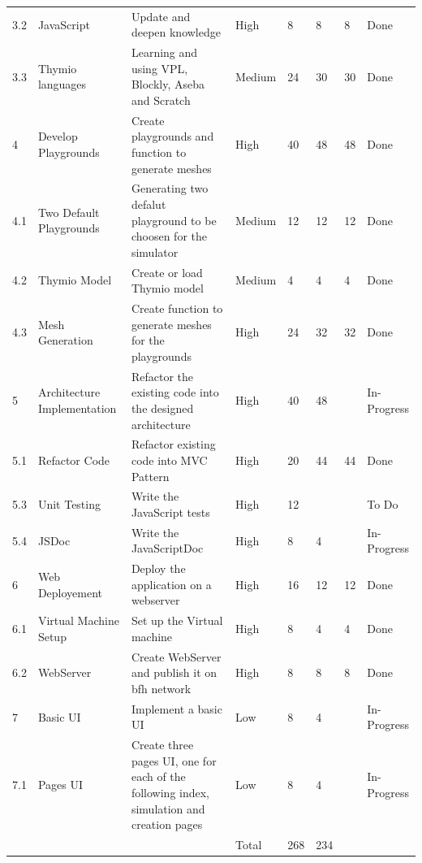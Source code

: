 \documentclass{scrartcl}
\begin{document}
\begin{longtable}{p{5mm}|p{2cm}|p{4cm}|p{1cm}|p{1cm}|p{1cm}|p{1cm}|p{1cm}}
  3.2 & JavaScript & Update and deepen knowledge  & High & 8 & 8 & 8 & Done \\ 
  3.3 & Thymio languages & Learning and using VPL, Blockly, Aseba and Scratch & Medium & 24 & 30 & 30 & Done \\ 
  4 & Develop Playgrounds & Create playgrounds and function to generate meshes & High & 40 & 48 & 48 & Done \\ 
  4.1 & Two Default Playgrounds & Generating two defalut playground to be choosen for the simulator & Medium & 12 & 12 & 12 & Done \\ 
  4.2 & Thymio Model & Create or load Thymio model & Medium & 4 & 4 & 4 & Done \\ 
  4.3 & Mesh Generation & Create function to generate meshes for the playgrounds & High & 24 & 32 & 32 & Done \\ 
  5 & Architecture Implementation & Refactor the existing code into the designed architecture & High & 40 & 48 &  & In-Progress \\ 
  5.1 & Refactor Code & Refactor existing code into MVC Pattern & High & 20 & 44 & 44 & Done \\ 
  5.3 & Unit Testing & Write the JavaScript tests & High & 12 &  &  & To Do \\
  5.4 & JSDoc & Write the JavaScriptDoc & High & 8 & 4 &  & In-Progress \\ 
  6 & Web Deployement & Deploy the application on a webserver & High & 16 & 12 & 12 & Done \\ 
  6.1 & Virtual Machine Setup & Set up the Virtual machine & High & 8 & 4 & 4 & Done \\ 
  6.2 & WebServer & Create WebServer and publish it on bfh network & High & 8 & 8 & 8 & Done \\ 
  7 & Basic UI & Implement a basic UI & Low & 8 & 4 &  & In-Progress \\ 
  7.1 & Pages UI & Create three pages UI, one for each of the following index, simulation and creation pages & Low & 8 & 4 &  & In-Progress \\ \hline
   &  &  & Total & 268 & 234 &  &  \\ 
\end{longtable}
\end{document}
